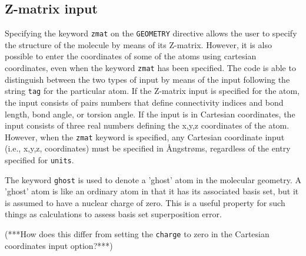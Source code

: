 \subsection{Z-matrix input}
\label{sec:Z-matrix}

Specifying the keyword \verb+zmat+ on the \verb+GEOMETRY+ directive allows
the user to specify the structure of the molecule by means of its Z-matrix.
However, it is also possible to enter the coordinates of some of the atoms using
cartesian coordinates, even when the keyword \verb+zmat+ has been specified.
The code is able to distinguish between
the two types of input by means of the input following the string \verb+tag+
for the particular atom.  If the Z-matrix input is specified for the atom,
the input consists of pairs numbers that define connectivity indices and 
bond length, bond angle, or torsion angle.  If the
input is in Cartesian coordinates, the input consists of three real numbers
defining the x,y,z coordinates of the atom.  However, when the \verb+zmat+
keyword is specified, any Cartesian coordinate input (i.e., x,y,z, coordinates)
must be specified in {\AA}ngstr{\o}ms, regardless of the entry specified
for \verb+units+.

The keyword \verb+ghost+ is used to denote a 'ghost' atom in the molecular
geometry.  A 'ghost' atom is like an ordinary atom in that it has its 
associated basis set, but it is assumed to have a nuclear charge of zero.
This is a useful property for such things as calculations to assess basis set
superposition error.  

\Large
(***How does this differ from setting the \verb+charge+
to zero in the Cartesian coordinates input option?***)
\normalsize

